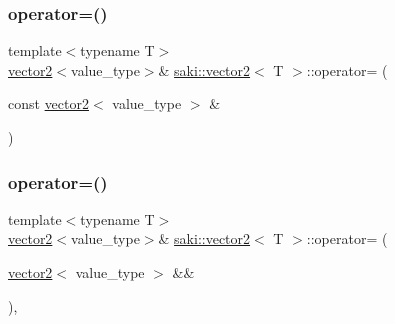 \mbox{\label{classsaki_1_1vector2_a1eb44aa9d36eb7cae665d4c8544f5205}} 
\subsubsection{\texorpdfstring{operator=()}{operator=()}\hspace{0.1cm}{\footnotesize\ttfamily [1/2]}}
{\footnotesize\ttfamily template$<$typename T$>$ \\
\mbox{\hyperlink{classsaki_1_1vector2}{vector2}}$<$value\+\_\+type$>$\& \mbox{\hyperlink{classsaki_1_1vector2}{saki\+::vector2}}$<$ T $>$\+::operator= (\begin{DoxyParamCaption}\item[{const \mbox{\hyperlink{classsaki_1_1vector2}{vector2}}$<$ value\+\_\+type $>$ \&}]{ }\end{DoxyParamCaption})\hspace{0.3cm}{\ttfamily [default]}}

\mbox{\label{classsaki_1_1vector2_affedbac760039d6968def3d5c5ed2f9f}} 
\subsubsection{\texorpdfstring{operator=()}{operator=()}\hspace{0.1cm}{\footnotesize\ttfamily [2/2]}}
{\footnotesize\ttfamily template$<$typename T$>$ \\
\mbox{\hyperlink{classsaki_1_1vector2}{vector2}}$<$value\+\_\+type$>$\& \mbox{\hyperlink{classsaki_1_1vector2}{saki\+::vector2}}$<$ T $>$\+::operator= (\begin{DoxyParamCaption}\item[{\mbox{\hyperlink{classsaki_1_1vector2}{vector2}}$<$ value\+\_\+type $>$ \&\&}]{ }\end{DoxyParamCaption})\hspace{0.3cm}{\ttfamily [default]}, {\ttfamily [noexcept]}}

\mbox{\label{classsaki_1_1vector2_a6bf127ca7ecdf4bc069bb172a147be1e}} 
